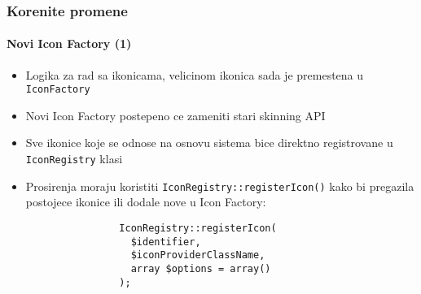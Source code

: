 \begin{frame}[fragile]
	\frametitle{Korenite promene}
	\framesubtitle{Novi Icon Factory (1)}

	\lstset{basicstyle=\smaller\ttfamily}

	\begin{itemize}

		\item Logika za rad sa ikonicama, velicinom ikonica sada je premestena u \texttt{IconFactory}

		\item Novi Icon Factory postepeno ce zameniti stari skinning API

		\item Sve ikonice koje se odnose na osnovu sistema bice direktno registrovane u \texttt{IconRegistry} klasi

		\item Prosirenja moraju koristiti \texttt{IconRegistry::registerIcon()} kako bi pregazila postojece ikonice ili dodale nove u Icon Factory:

			\begin{lstlisting}
				IconRegistry::registerIcon(
				  $identifier,
				  $iconProviderClassName,
				  array $options = array()
				);
			\end{lstlisting}

	\end{itemize}

\end{frame}



